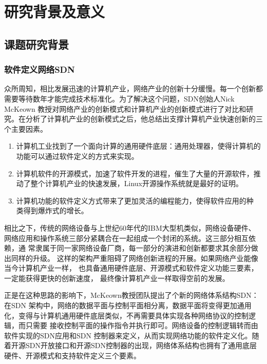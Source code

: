 \section{研究背景及意义}
\subsection{课题研究背景}
\subsubsection{软件定义网络SDN}
众所周知，相比发展迅速的计算机产业，网络产业的创新十分缓慢。每一个创新都 需要等待数年才能完成技术标准化。为了解决这个问题，SDN创始人Nick McKeown 教授对网络产业的创新模式和计算机产业的创新模式进行了对比和研究。在分析了计算机产业的创新模式之后，他总结出支撑计算机产业快速创新的三个主要因素。
\begin{enumerate}
  \item 计算机工业找到了一个面向计算的通用硬件底层：通用处理器，使得计算机的功能可以通过软件定义的方式来实现。
  \item 计算机软件的开源模式，加速了软件开发的进程，催生了大量的开源软件，推动了整个计算机产业的快速发展，Linux开源操作系统就是最好的证明。
  \item 计算机功能的软件定义方式带来了更加灵活的编程能力，使得软件应用的种 类得到爆炸式的增长。
\end{enumerate}

相比之下，传统的网络设备与上世纪60年代的IBM大型机类似，网络设备硬件、 网络应用和操作系统三部分紧耦合在一起组成一个封闭的系统。这三部分相互依赖，通 常隶属于同一家网络设备厂商，每一部分的演进和创新都要求其余部分做出同样的升级。 这样的架构严重阻碍了网络创新进程的开展。如果网络产业能像当今计算机产业一样， 也具备通用硬件底层、开源模式和软件定义功能三要素，一定能获得更快的创新速度， 最终像计算机产业一样取得空前的发展。

正是在这种思路的影响下，McKeown教授团队提出了个新的网络体系结构SDN\cite{mckeown2008openflow}： 在SDN 架构中，网络的数据平面与控制平面相分离，数据平面将变得更加通用化，变得与计算机通用硬件底层类似，不再需要具体实现各种网络协议的控制逻辑，而只需要 接收控制平面的操作指令并执行即可。网络设备的控制逻辑转而由软件实现的SDN应用和SDN 控制器来定义，从而实现网络功能的软件定义化。随着开源SDN开放接口和开源SDN控制器的出现，网络体系结构也拥有了通用底层硬件、开源模式和支持软件定义三个要素。

